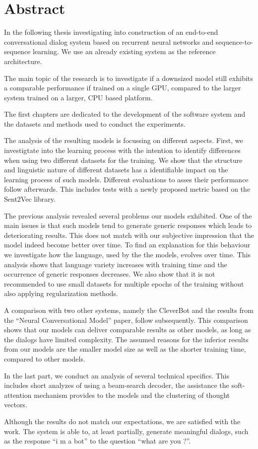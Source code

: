 \chapter*{Abstract}
In the following thesis investigating into construction of an end-to-end conversational dialog system based on recurrent neural networks and sequence-to-sequence learning. We use an already existing system as the reference architecture. 

The main topic of the research is to investigate if a downsized model still exhibits a comparable performance if trained on a single GPU, compared to the larger system trained on a larger, CPU based platform.

The first chapters are dedicated to the development of the software system and the datasets and methods used to conduct the experiments.

The analysis of the resulting models is focussing on different aspects. First, we investigtate into the learning process with the intention to identify differences when using two different datasets for the training. We show that the structure and linguistic nature of different datasets has a identifiable impact on the learning process of such models. Different evaluations to asses their performance follow afterwards. This includes tests with a newly proposed metric based on the Sent2Vec library.

The previous analysis revealed several problems our models exhibited. One of the main issues is that such models tend to generate generic responses which leads to deteriorating results. This does not match with our subjective impression that the model indeed become better over time. To find an explanation for this behaviour we investigate how the language, used by the the models, evolves over time. This analysis shows that language variety increases with training time and the occurrence of generic responses decreases. We also show that it is not recommended to use small datasets for multiple epochs of the training without also applying regularization methods.

A comparison with two other systems, namely the CleverBot and the results from the ``Neural Conversational Model'' paper, follow subsequently. This comparison shows that our models can deliver comparable results as other models, as long as the dialogs have limited complexity. The assumed reasons for the inferior results from our models are the smaller model size as well as the shorter training time, compared to other models.

In the last part, we conduct an analysis of several technical specifics. This includes short analyzes of using a beam-search decoder, the assistance the soft-attention mechanism provides to the models and the clustering of thought vectors. 

Although the results do not match our expectations, we are satisfied with the work. The system is able to, at least partially, generate meaningful dialogs, such as the response ``i m a bot'' to the question ``what are you ?''.
